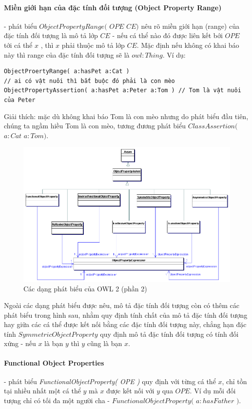\paragraph{Miền giới hạn của đặc tính đối tượng (Object Property Range)} - phát biểu $ObjectPropertyRange($ $OPE$ $CE)$ nêu rõ miền giới hạn (range) của đặc tính đối tượng là mô tả lớp $CE$ -  nếu cá thể nào đó được liên kết bới $OPE$ tới cá thể $x$ , thì $x$ phải thuộc mô tả lớp $CE$. Mặc định nếu không có khai báo này thì range của đặc tính đối tượng sẽ là $owl:Thing$. Ví dụ:
\begin{verbatim}
ObjectProertyRange( a:hasPet a:Cat ) 
// ai có vật nuôi thì bắt buộc đó phải là con mèo
ObjectPropertyAssertion( a:hasPet a:Peter a:Tom ) // Tom là vật nuôi của Peter
\end{verbatim}
Giải thích: mặc dù không khai báo Tom là con mèo nhưng do phát biểu đầu tiên, chúng ta ngầm hiều Tom là con mèo, tương đương phát biểu $ClassAssertion($ $a:Cat$ $a:Tom)$.
\\
\begin{figure}[h]
	\centering
	\includegraphics[width=120mm]{Figures/objectpropertyAxiom1.png}
	\caption{Các dạng phát biểu của OWL 2 (phần 2) \label{overflow}}
\end{figure}
Ngoài các dạng phát biểu được nêu, mô tả đặc tính đối tượng còn có thêm các phát biểu trong hình sau, nhằm quy định tính chất của mô tả đặc tính đối tượng hay giữa các cá thể được kết nối bằng các đặc tính đối tượng này, chẳng hạn đặc tính $SymmetricObjectProperty$ quy định mô tả đặc tính đối tượng có tính đối xứng - nếu $x$ là bạn $y$ thì $y$ cũng là bạn $x$. 

\paragraph{Functional Object Properties} - phát biểu \textit{FunctionalObjectProperty( OPE )} quy định với từng cá thể $x$, chỉ tồn tại nhiều nhất một cá thể $y$ mà $x$ được kết nối với $y$ qua $OPE$. Ví dụ mỗi đối tượng chỉ có tối đa một người cha - $FunctionalObjectProperty($ $a:hasFather$ $)$. 

